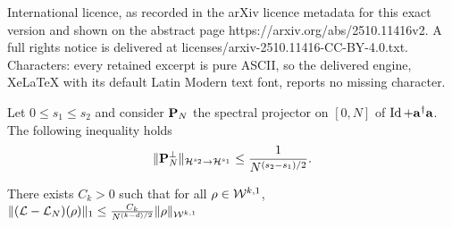 \documentclass[10pt,a4paper]{amsart}
\newcommand{\Id}{\operatorname{Id}}
\newcommand{\oP}{{\bf P}}
\newcommand{\oa}{{\bf a}}
\newcommand{\orho}{{\bf \rho}}
\newcommand{\xH}{\mathcal{H}}
\newcommand{\xL}{\mathcal{L}}
\newcommand{\xW}{\mathcal{W}}
\begin{document}
International licence, as recorded in the arXiv licence metadata for this exact version and shown on the abstract page https://arxiv.org/abs/2510.11416v2. A full rights notice is delivered at licenses/arxiv-2510.11416-CC-BY-4.0.txt. Characters: every retained excerpt is pure ASCII, so the delivered engine, XeLaTeX with its default Latin Modern text font, reports no missing character.
\begin{lemma}
    \label{lem:reg_vs_rate}
    Let $0 \leq s_1 \leq s_2$ and consider $\oP_N$ the spectral projector on $[0,N]$ of $\Id + \oa^\dag \oa$. The following inequality holds
    \begin{align}
        \|\oP_N^\perp\|_{\xH^{s_2}\to \xH^{s_1}}\leq \frac{1}{N^{(s_2-s_1)/2}}.
    \end{align}
\end{lemma}

\begin{lemma}
    \label{lem:key_estimate}
    There exists $C_k>0$ such that for all $\orho\in \xW^{k,1}$,
    $\| (\xL-\xL_N)(\orho)\|_1\leq \frac{C_k}{N^{(k-d)/2}} \|\orho\|_{\xW^{k,1}}$
\end{lemma}
\end{document}
